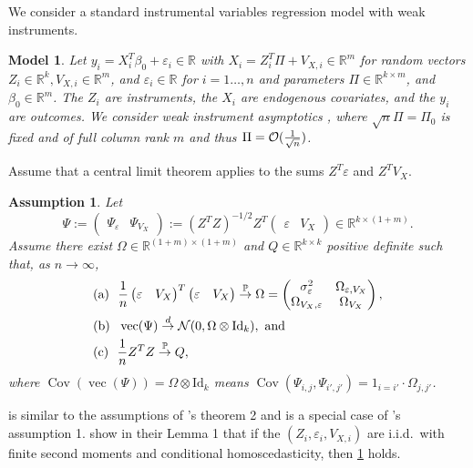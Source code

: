 \documentclass[11pt,hidelinks,a4paper]{article}
\newtheorem{assumption}{Assumption}
\newtheorem{model}{Model}
\newcommand{\BP}{{\mathbb{P}}}
\newcommand{\BR}{{\mathbb{R}}}
\newcommand{\CN}{{\cal N}}
\newcommand{\CO}{{\cal O}}
\DeclareMathOperator{\Cov}{Cov}
\DeclareMathOperator{\vecop}{vec}
\newcommand{\Id}{\mathrm{Id}}
\newcommand{\tod}{\overset{d}{\to}}
\newcommand{\toP}{\overset{\BP}{\to}}
\begin{document}
We consider a standard instrumental variables regression model with weak instruments.
\begin{model}
    \label{model:0}
    Let $y_i = X_i^T \beta_0 + \varepsilon_i \in \BR$ with $X_i = Z_i^T \Pi + V_{X, i} \in \BR^m$ for random vectors $Z_i \in \BR^k, V_{X, i}\in \BR^m$, and $\varepsilon_i \in \BR$ for $i=1\ldots, n$ and parameters $\Pi \in \BR^{k \times m}$, and $\beta_0 \in \BR^m$.
    The $Z_i$ are \emph{instruments}, the $X_i$ are \emph{endogenous covariates}, and the $y_i$ are \emph{outcomes}.
    We consider \emph{weak instrument asymptotics} \citep{staiger1997instrumental}, where $\sqrt{n} \Pi = \Pi_0$ is fixed and of full column rank $m$ and thus $\Pi = \CO(\frac{1}{\sqrt{n}})$.
\end{model}%
\noindent Assume that a central limit theorem applies to the sums $Z^T \varepsilon$ and $Z^T V_X$.
\begin{assumption}
    \label{ass:0}
    Let
    $$
    \Psi := \begin{pmatrix} \Psi_{\varepsilon} & \Psi_{V_X} \end{pmatrix} := (Z^T Z)^{-1/2} Z^T \begin{pmatrix} \varepsilon & V_X \end{pmatrix} \in \BR^{k \times (1 + m)}.
    $$
    Assume there exist $\Omega \in \BR^{(1+m) \times (1+m)}$ and $Q \in \BR^{k \times k}$ positive definite such that, as $n \to \infty$,
    \begin{align*}
        &\mathrm{(a)} \ \ \frac{1}{n} \begin{pmatrix}\varepsilon & V_X \end{pmatrix}^T \begin{pmatrix}\varepsilon & V_X \end{pmatrix} \toP \Omega = \begin{pmatrix}
    \sigma^2_\varepsilon & \Omega_{\varepsilon, V_X} \\
    \Omega_{V_X, \varepsilon} & \Omega_{V_X} \\
\end{pmatrix}, \\
        &\mathrm{(b)} \ \ \vecop(\Psi) \tod \CN(0, \Omega \otimes \Id_k), \text{ and }\\
        &\mathrm{(c)} \ \ \frac{1}{n} Z^T Z \toP Q,
    \end{align*}
    where $\Cov(\vecop(\Psi)) = \Omega \otimes \Id_k$ means $\Cov(\Psi_{i, j}, \Psi_{i', j'}) = 1_{i = i'} \cdot \Omega_{j, j'}$.
\end{assumption}
\noindent {} is similar to the assumptions of \citeauthor{moreira2003conditional}'s \citeyearpar{moreira2003conditional} theorem 2 and is a special case of \citeauthor{kleibergen2007generalizing}'s \citeyearpar{kleibergen2007generalizing} assumption 1.
\citet{londschien2025statistician} show in their Lemma 1 that if the $(Z_i, \varepsilon_i, V_{X, i})$ are i.i.d.\ with finite second moments and conditional homoscedasticity, then \cref{ass:0} holds.
\end{document}
